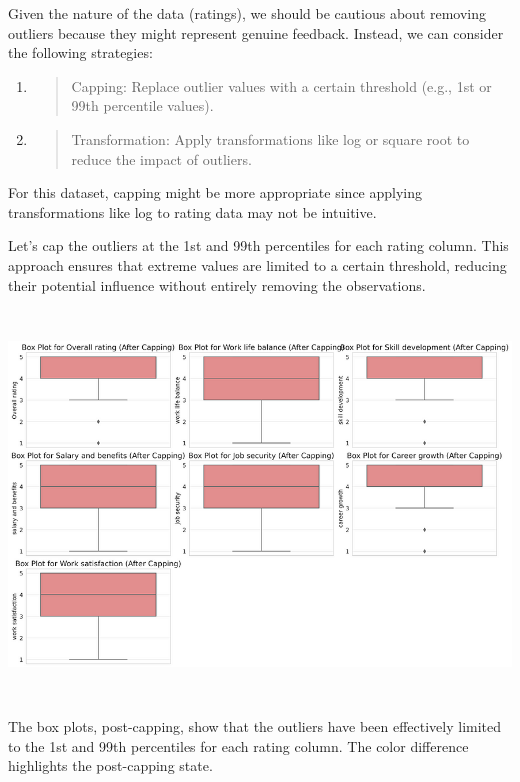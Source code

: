 \documentclass[
]{article}
\begin{document}
Given the nature of the data (ratings), we should be cautious about
removing outliers because they might represent genuine feedback.
Instead, we can consider the following strategies:

\begin{enumerate}
\def\labelenumi{\arabic{enumi}.}
\item
  \begin{quote}
  Capping: Replace outlier values with a certain threshold (e.g., 1st or
  99th percentile values).
  \end{quote}
\item
  \begin{quote}
  Transformation: Apply transformations like log or square root to
  reduce the impact of outliers.
  \end{quote}
\end{enumerate}

For this dataset, capping might be more appropriate since applying
transformations like log to rating data may not be intuitive.

Let's cap the outliers at the 1st and 99th percentiles for each rating
column. This approach ensures that extreme values are limited to a
certain threshold, reducing their potential influence without entirely
removing the observations.

\includegraphics[width=5.26806in,height=4.05486in]{image12.png}

The box plots, post-capping, show that the outliers have been
effectively limited to the 1st and 99th percentiles for each rating
column. The color difference highlights the post-capping state.
\end{document}
